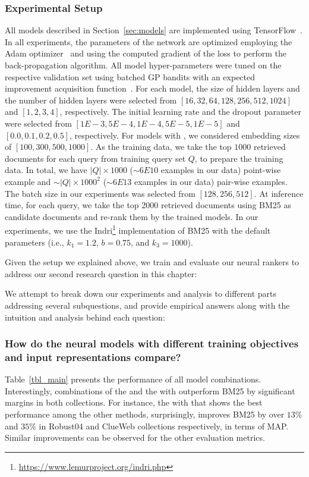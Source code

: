 \subsubsection{Experimental Setup}
All models described in Section~\ref{sec:models} are implemented using TensorFlow~\citep{tang2016:tflearn,tensorflow2015-whitepaper}.
In all experiments, the parameters of the network are optimized employing the Adam optimizer~\citep{Kingma:2014} and using the computed gradient of the loss to perform the back-propagation algorithm.
All model hyper-parameters were tuned on the respective validation set using batched GP bandits with an expected improvement acquisition function~\citep{Desautels:2014}. 
For each model, the size of hidden layers and the number of hidden layers were selected from $[16, 32, 64, 128, 256, 512, 1024]$ and $[1, 2, 3, 4]$, respectively. The initial learning rate and the dropout parameter were selected from $[1E-3, 5E-4, 1E-4, 5E-5, 1E-5]$ and $[0.0, 0.1, 0.2, 0.5]$, respectively. For models with \feedthree, we considered embedding sizes of $[100, 300, 500, 1000]$. As the training data, we take the top $1000$ retrieved documents for each query from training query set $Q$, to prepare the training data. In total, we have $|Q|\times 1000$ ($\sim6E10$ examples in our data) point-wise example and $\sim|Q|\times 1000^2$ ($\sim6E13$ examples in our data) pair-wise examples. The batch size in our experiments was selected from  $[128, 256, 512]$.
%
At inference time, for each query, we take the top $2000$ retrieved documents using BM25 as candidate documents and re-rank them by the trained models. In our experiments, we use the Indri\footnote{\url{https://www.lemurproject.org/indri.php}} implementation of BM25 with the default parameters (i.e., $k_1 = 1.2$, $b = 0.75$, and $k_3 = 1000$).


\bigskip
Given the setup we explained above, we train and evaluate our neural rankers to address our second research question in this chapter:

We attempt to break down our experiments and analysis to different parts addressing several subquestions, and provide empirical answers along with the intuition and analysis behind each question:

 
\subsubsection{How do the neural models with different training objectives and input representations compare?}
%
Table~\ref{tbl_main} presents the performance of all model combinations.
Interestingly, combinations of the \modeltwo and the \modelthree with \feedthree outperform BM25 by significant margins in both collections. For instance, the \modelthree with \feedthree that shows the best performance among the other methods, surprisingly, improves BM25 by over $13\%$ and $35\%$ in Robust04 and ClueWeb collections respectively, in terms of MAP. Similar improvements can be observed for the other evaluation metrics.

